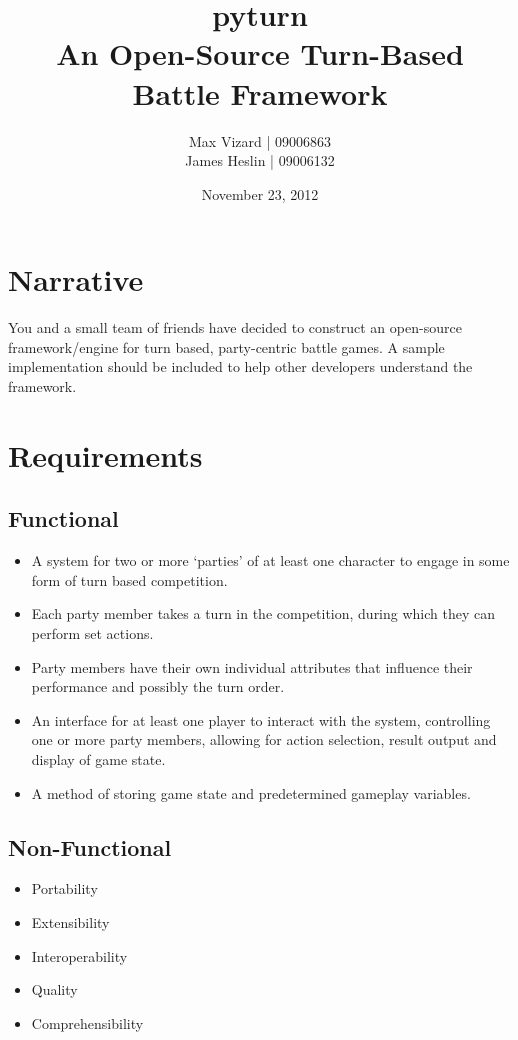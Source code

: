 \documentclass[11pt]{report}
\title{\textbf{pyturn}\\
An Open-Source Turn-Based Battle Framework}
\author{Max Vizard | 09006863\\
		James Heslin | 09006132\\}
\date{November 23, 2012}
\begin{document}
\maketitle

\tableofcontents{}
\pagebreak

\section{Narrative}
You and a small team of friends have decided to construct an open-source framework/engine for turn based, party-centric battle games. A sample implementation should be included to help other developers understand the framework. 

\section{Requirements}
	\subsection{Functional}
	\begin{itemize}
			\item{A system for two or more ‘parties’ of at least one character to engage in some form of turn based competition.}
			\item{Each party member takes a turn in the competition, during which they can perform set actions.}
			\item{Party members have their own individual attributes that influence their performance and possibly the turn order.}
			\item{An interface for at least one player to interact with the system, controlling one or more party members, allowing for action selection, result output and display of game state.}
			\item{A method of storing game state and predetermined gameplay variables.}
	\end{itemize}
	\subsection{Non-Functional}
	\begin{itemize}
		\item{Portability}
		\item{Extensibility}
		\item{Interoperability}
		\item{Quality}
		\item{Comprehensibility}
	\end{itemize}
\end{document}
